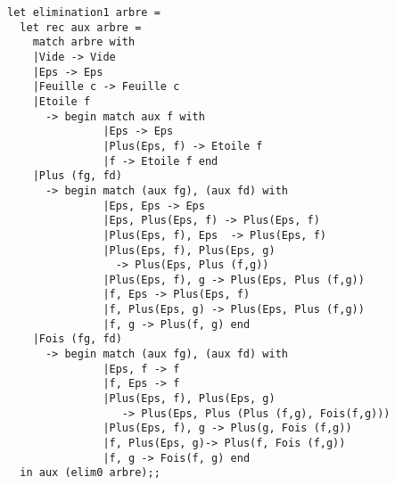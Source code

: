 \begin{Answer}
\begin{lstlisting}
let elimination1 arbre = 
  let rec aux arbre =
    match arbre with
    |Vide -> Vide
    |Eps -> Eps
    |Feuille c -> Feuille c
    |Etoile f 
      -> begin match aux f with
               |Eps -> Eps
               |Plus(Eps, f) -> Etoile f
               |f -> Etoile f end
    |Plus (fg, fd) 
      -> begin match (aux fg), (aux fd) with
               |Eps, Eps -> Eps
               |Eps, Plus(Eps, f) -> Plus(Eps, f)
               |Plus(Eps, f), Eps  -> Plus(Eps, f)
               |Plus(Eps, f), Plus(Eps, g) 
                 -> Plus(Eps, Plus (f,g))
               |Plus(Eps, f), g -> Plus(Eps, Plus (f,g))
               |f, Eps -> Plus(Eps, f)
               |f, Plus(Eps, g) -> Plus(Eps, Plus (f,g))
               |f, g -> Plus(f, g) end
    |Fois (fg, fd) 
      -> begin match (aux fg), (aux fd) with
               |Eps, f -> f
               |f, Eps -> f
               |Plus(Eps, f), Plus(Eps, g) 
                  -> Plus(Eps, Plus (Plus (f,g), Fois(f,g)))
               |Plus(Eps, f), g -> Plus(g, Fois (f,g))
               |f, Plus(Eps, g)-> Plus(f, Fois (f,g))
               |f, g -> Fois(f, g) end
  in aux (elim0 arbre);;
\end{lstlisting}
\newpage
\end{Answer}



